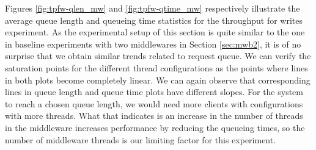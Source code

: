 \documentclass[11pt,a4paper]{article}
\begin{document}
\par Figures \ref{fig:tpfw-qlen_mw} and \ref{fig:tpfw-qtime_mw} respectively illustrate the average queue length and queueing time statistics for the throughput for writes experiment. As the experimental setup of this section is quite similar to the one in baseline experiments with two middlewares in Section \ref{sec:mwb2}, it is of no surprise that we obtain similar trends related to request queue. We can verify the saturation points for the different thread configurations as the points where lines in both plots become completely linear. We can again observe that corresponding lines in queue length and queue time plots have different slopes. For the system to reach a chosen queue length, we would need more clients with configurations with more threads. What that indicates is an increase in the number of threads in the middleware increases performance by reducing the queueing times, so the number of middleware threads is our limiting factor for this experiment.
\end{document}
